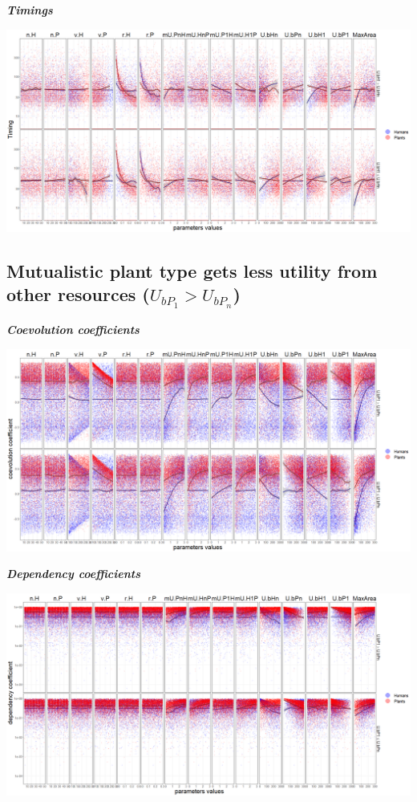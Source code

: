 \documentclass[
]{book}
\begin{document}
\textbf{\emph{Timings}}

\includegraphics[width=1\linewidth]{plots/5_multiplePar-timing-humanLessBase-ggplot}

\newpage

\hypertarget{mutualistic-plant-type-gets-less-utility-from-other-resources-u_bp_1u_bp_n}{%
\subsection{\texorpdfstring{Mutualistic plant type gets less utility from other resources (\(U_{bP_{1}}>U_{bP_{n}}\))}{Mutualistic plant type gets less utility from other resources (U\_\{bP\_\{1\}\}\textgreater U\_\{bP\_\{n\}\})}}\label{mutualistic-plant-type-gets-less-utility-from-other-resources-u_bp_1u_bp_n}}


\textbf{\emph{Coevolution coefficients}}

\includegraphics[width=1\linewidth]{plots/5_multiplePar-coevo-plantLessBase-ggplot}

\textbf{\emph{Dependency coefficients}}

\includegraphics[width=1\linewidth]{plots/5_multiplePar-depend-plantLessBase-ggplot}
\end{document}

